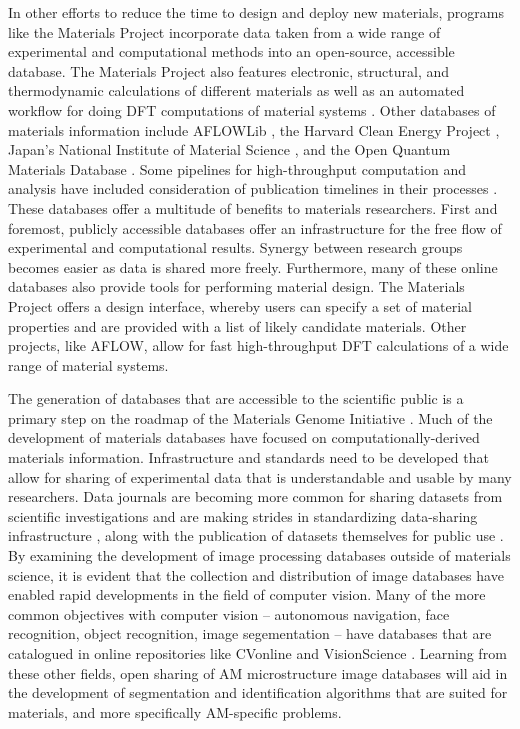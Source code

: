 In other efforts to reduce the time to design and deploy new materials, programs like the Materials Project incorporate data taken from a wide range of experimental and computational methods into an open-source, accessible database. The Materials Project also features electronic, structural, and thermodynamic calculations of different materials as well as an automated workflow for doing DFT computations of material systems \cite{Jain2011, Jain2013}. Other databases of materials information include AFLOWLib \cite{Curtarolo2012, Curtarolo2012a}, the Harvard Clean Energy Project \cite{Hachmann2011}, Japan's National Institute of Material Science \cite{NIMS}, and the Open Quantum Materials Database \cite{Saal2013}. Some pipelines for high-throughput computation and analysis have included consideration of publication timelines in their processes \cite{Foster2015}. These databases offer a multitude of benefits to materials researchers. First and foremost, publicly accessible databases offer an infrastructure for the free flow of experimental and computational results. Synergy between research groups becomes easier as data is shared more freely. Furthermore, many of these online databases also provide tools for performing material design. The Materials Project offers a design interface, whereby users can specify a set of material properties and are provided with a list of likely candidate materials. Other projects, like AFLOW, allow for fast high-throughput DFT calculations of a wide range of material systems.

The generation of databases that are accessible to the scientific public is a primary step on the roadmap of the Materials Genome Initiative \cite{DePablo2014}. Much of the development of materials databases have focused on computationally-derived materials information. Infrastructure and standards need to be developed that allow for sharing of experimental data that is understandable and usable by many researchers. Data journals are becoming more common for sharing datasets from scientific investigations and are making strides in standardizing data-sharing infrastructure \cite{Wilkinson2016}, along with the publication of datasets themselves for public use \cite{DeJong2015, Kim2017}. By examining the development of image processing databases outside of materials science, it is evident that the collection and distribution of image databases have enabled rapid developments in the field of computer vision. Many of the more common objectives with computer vision -- autonomous navigation, face recognition, object recognition, image segementation -- have databases that are catalogued in online repositories like CVonline \cite{CVonline} and VisionScience \cite{VisionScience}. Learning from these other fields, open sharing of AM microstructure image databases will aid in the development of segmentation and identification algorithms that are suited for materials, and more specifically AM-specific problems.

